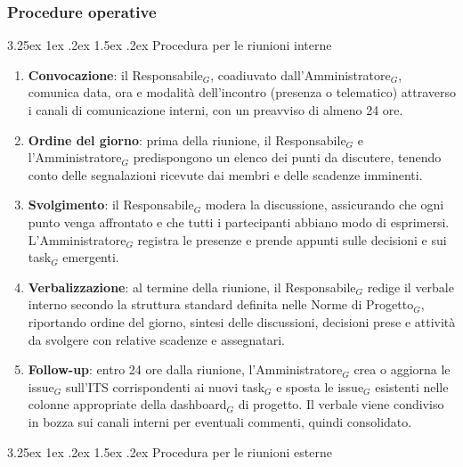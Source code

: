 \documentclass[a4paper, 10pt]{article}
\makeatletter
\renewcommand\paragraph{\@startsection{paragraph}{4}{\z@}%
  {3.25ex \@plus1ex \@minus .2ex}%
  {1.5ex \@plus .2ex}%
  {\normalfont\normalsize\bfseries}}
\makeatother
\begin{document}
\subsubsection{Procedure operative}
\label{subsubsec:procedure_coordinamento}

\paragraph{Procedura per le riunioni interne}

\begin{enumerate}
    \item \textbf{Convocazione}: il Responsabile$_G$, coadiuvato dall'Amministratore$_G$, comunica data, ora e modalità dell'incontro (presenza o telematico) attraverso i canali di comunicazione interni, con un preavviso di almeno 24 ore.
    \item \textbf{Ordine del giorno}: prima della riunione, il Responsabile$_G$ e l'Amministratore$_G$ predispongono un elenco dei punti da discutere, tenendo conto delle segnalazioni ricevute dai membri e delle scadenze imminenti.
    \item \textbf{Svolgimento}: il Responsabile$_G$ modera la discussione, assicurando che ogni punto venga affrontato e che tutti i partecipanti abbiano modo di esprimersi. L'Amministratore$_G$ registra le presenze e prende appunti sulle decisioni e sui task$_G$ emergenti.
    \item \textbf{Verbalizzazione}: al termine della riunione, il Responsabile$_G$ redige il verbale interno secondo la struttura standard definita nelle Norme di Progetto$_G$, riportando ordine del giorno, sintesi delle discussioni, decisioni prese e attività da svolgere con relative scadenze e assegnatari.
    \item \textbf{Follow-up}: entro 24 ore dalla riunione, l'Amministratore$_G$ crea o aggiorna le issue$_G$ sull'ITS corrispondenti ai nuovi task$_G$ e sposta le issue$_G$ esistenti nelle colonne appropriate della dashboard$_G$ di progetto. Il verbale viene condiviso in bozza sui canali interni per eventuali commenti, quindi consolidato.
\end{enumerate}

\paragraph{Procedura per le riunioni esterne}
\end{document}
